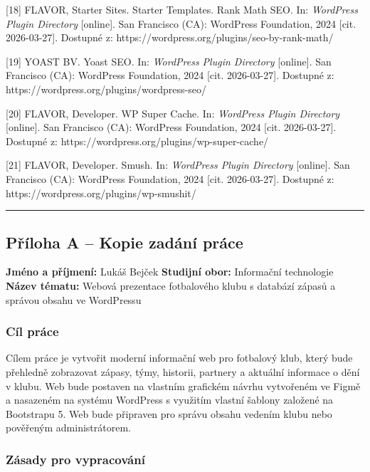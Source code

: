 {[}18{]} FLAVOR, Starter Sites. Starter Templates. Rank Math SEO. In:
\emph{WordPress Plugin Directory} {[}online{]}. San Francisco (CA):
WordPress Foundation, 2024 {[}cit. 2026-03-27{]}. Dostupné z:
https://wordpress.org/plugins/seo-by-rank-math/

{[}19{]} YOAST BV. Yoast SEO. In: \emph{WordPress Plugin Directory}
{[}online{]}. San Francisco (CA): WordPress Foundation, 2024 {[}cit.
2026-03-27{]}. Dostupné z: https://wordpress.org/plugins/wordpress-seo/

{[}20{]} FLAVOR, Developer. WP Super Cache. In: \emph{WordPress Plugin
Directory} {[}online{]}. San Francisco (CA): WordPress Foundation, 2024
{[}cit. 2026-03-27{]}. Dostupné z:
https://wordpress.org/plugins/wp-super-cache/

{[}21{]} FLAVOR, Developer. Smush. In: \emph{WordPress Plugin Directory}
{[}online{]}. San Francisco (CA): WordPress Foundation, 2024 {[}cit.
2026-03-27{]}. Dostupné z: https://wordpress.org/plugins/wp-smushit/

\begin{center}\rule{0.5\linewidth}{0.5pt}\end{center}

\subsection{Příloha A -- Kopie zadání
práce}\label{pux159uxedloha-a-kopie-zaduxe1nuxed-pruxe1ce}

\textbf{Jméno a příjmení:} Lukáš Bejček \textbf{Studijní obor:}
Informační technologie \textbf{Název tématu:} Webová prezentace
fotbalového klubu s databází zápasů a správou obsahu ve WordPressu

\subsubsection{Cíl práce}\label{cuxedl-pruxe1ce}

Cílem práce je vytvořit moderní informační web pro fotbalový klub, který
bude přehledně zobrazovat zápasy, týmy, historii, partnery a aktuální
informace o dění v klubu. Web bude postaven na vlastním grafickém návrhu
vytvořeném ve Figmě a nasazeném na systému WordPress s využitím vlastní
šablony založené na Bootstrapu 5. Web bude připraven pro správu obsahu
vedením klubu nebo pověřeným administrátorem.

\subsubsection{Zásady pro
vypracování}\label{zuxe1sady-pro-vypracovuxe1nuxed}

